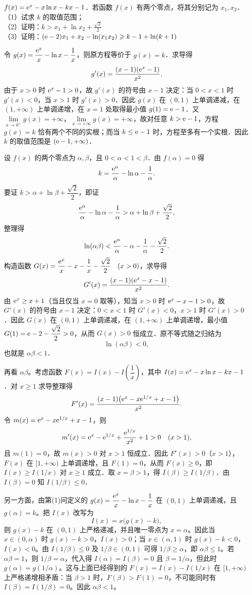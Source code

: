 \begin{example}[黎曼杯T18加强]
     $f(x) = \mathrm{e}^x-x\ln x - kx - 1$．若函数 $f(x)$ 有两个零点，将其分别记为 $x_1,x_2$．\\（1）试求 $k$ 的取值范围；\\（2）证明：$\displaystyle k>x_1+\ln x_2+\frac{\sqrt2}{2}$\\
     （3）证明：$(\mathrm{e}-2)x_1+x_2-\ln(x_1x_2)\geqslant k-1+\ln(k+1)$
\end{example}
\begin{solution}
令 $g(x)=\dfrac{\mathrm{e}^x}{x}-\ln x-\dfrac{1}{x}$，则原方程等价于 $g(x)=k$．求导得
\[
g'(x)=\frac{(x-1)(\mathrm{e}^x-1)}{x^2}.
\]
由于 $x>0$ 时 $\mathrm{e}^x-1>0$，故 $g'(x)$ 的符号由 $x-1$ 决定：当 $0<x<1$ 时 $g'(x)<0$，当 $x>1$ 时 $g'(x)>0$．因此 $g(x)$ 在 $(0,1)$ 上单调递减，在 $(1,+\infty)$ 上单调递增，在 $x=1$ 处取得最小值 $g(1)=\mathrm{e}-1$．又 $\lim\limits_{x\to0^+}g(x)=+\infty$，$\lim\limits_{x\to+\infty}g(x)=+\infty$，故对任意 $k>\mathrm{e}-1$，方程 $g(x)=k$ 恰有两个不同的实根；而当 $k\le \mathrm{e}-1$ 时，方程至多有一个实根．因此 $k$ 的取值范围是 $(\mathrm{e}-1,+\infty)$．

设 $f(x)$ 的两个零点为 $\alpha,\beta$，且 $0<\alpha<1<\beta$．由 $f(\alpha)=0$ 得
\[
k=\frac{\mathrm{e}^\alpha}{\alpha}-\ln\alpha-\frac1\alpha.
\]
要证 $k>\alpha+\ln\beta+\dfrac{\sqrt2}{2}$，即证
\[
\frac{\mathrm{e}^\alpha}{\alpha}-\ln\alpha-\frac1\alpha>\alpha+\ln\beta+\frac{\sqrt2}{2},
\]
整理得
\[
\ln(\alpha\beta)<\frac{\mathrm{e}^\alpha}{\alpha}-\alpha-\frac1\alpha-\frac{\sqrt2}{2}.
\]
构造函数 $G(x)=\dfrac{\mathrm{e}^x}{x}-x-\dfrac1x-\dfrac{\sqrt2}{2}\quad(x>0)$，求导得
\[
G'(x)=\frac{(x-1)(\mathrm{e}^x-x-1)}{x^2}.
\]
由 $\mathrm{e}^x\ge x+1$（当且仅当 $x=0$ 取等），知当 $x>0$ 时 $\mathrm{e}^x-x-1>0$，故 $G'(x)$ 的符号由 $x-1$ 决定：$0<x<1$ 时 $G'(x)<0$，$x>1$ 时 $G'(x)>0$．因此 $G(x)$ 在 $(0,1)$ 上单调递减，在 $(1,+\infty)$ 上单调递增，最小值 $G(1)=\mathrm{e}-2-\dfrac{\sqrt2}{2}>0$，从而 $G(x)>0$ 恒成立．原不等式随之归结为
\[
\ln(\alpha\beta)<0,
\]
也就是 $\alpha\beta<1$．

再看 $\alpha\beta$。考虑函数 $F(x)=I(x)-I\!\left(\dfrac1x\right)$，其中 $I(x)=\mathrm{e}^x-x\ln x-kx-1$．对 $x\ge1$ 求导整理得
\[
F'(x)=\frac{(x-1)\bigl(\mathrm{e}^x-x\mathrm{e}^{1/x}+x-1\bigr)}{x^2}.
\]
令 $m(x)=\mathrm{e}^x-x\mathrm{e}^{1/x}+x-1$，则
\[
m'(x)=\mathrm{e}^x-\mathrm{e}^{1/x}+\frac{\mathrm{e}^{1/x}}{x^2}+1>0\quad(x>1),
\]
且 $m(1)=0$，故 $m(x)>0$ 对 $x>1$ 恒成立．因此 $F'(x)>0$（$x>1$），$F(x)$ 在 $[1,+\infty)$ 上单调递增，且 $F(1)=0$，从而 $F(x)\ge0$，即 $I(x)\ge I(1/x)$ 对 $x\ge1$ 成立．取 $x=\beta>1$，得 $I(\beta)\ge I(1/\beta)$．由 $I(\beta)=0$ 知 $I(1/\beta)\le0$．

另一方面，由第(1)问定义的 $g(x)=\dfrac{\mathrm{e}^x}{x}-\ln x-\dfrac1x$ 在 $(0,1)$ 上单调递减，且 $g(\alpha)=k$。把 $I(x)$ 改写为
\[
I(x)=x\bigl(g(x)-k\bigr),
\]
则 $g(x)-k$ 在 $(0,1)$ 上严格递减，并且唯一零点为 $x=\alpha$。因此当 $x\in(0,\alpha)$ 时 $g(x)-k>0$，$I(x)>0$；当 $x\in(\alpha,1)$ 时 $g(x)-k<0$，$I(x)<0$。由 $I(1/\beta)\le0$ 及 $1/\beta\in(0,1)$ 可得 $1/\beta\ge\alpha$，即 $\alpha\beta\le1$。若 $\alpha\beta=1$，则 $1/\beta=\alpha$，代入得 $I(\alpha)=I(\beta)=0$ 且 $\beta=1/\alpha$，但此时 $g(\alpha)=g(1/\alpha)$。这与上面已经得到的 $F(x)=I(x)-I(1/x)$ 在 $[1,+\infty)$ 上严格递增相矛盾：当 $\beta>1$ 时，$F(\beta)>F(1)=0$，不可能同时有 $I(\beta)=I(1/\beta)=0$。因此 $\alpha\beta<1$。


\end{solution}
